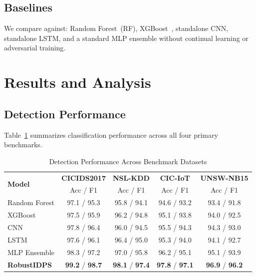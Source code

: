 \documentclass[journal,twoside]{IEEEtran}
\begin{document}
\subsection{Baselines}
We compare against: Random Forest~(RF), XGBoost~\cite{Chen2016}, standalone CNN, standalone LSTM, and a standard MLP ensemble without continual learning or adversarial training.

\section{Results and Analysis}
\label{sec:results}

\subsection{Detection Performance}

Table~\ref{tab:detection} summarizes classification performance across all four primary benchmarks.

\begin{table}[!t]
\centering
\caption{Detection Performance Across Benchmark Datasets}
\label{tab:detection}
\renewcommand{\arraystretch}{1.15}
\begin{tabular}{@{}lcccc@{}}
\toprule
\multirow{2}{*}{\textbf{Model}} & \textbf{CICIDS2017} & \textbf{NSL-KDD} & \textbf{CIC-IoT} & \textbf{UNSW-NB15} \\
 & Acc / F1 & Acc / F1 & Acc / F1 & Acc / F1 \\
\midrule
Random Forest   & 97.1 / 95.3 & 95.8 / 94.1 & 94.6 / 93.2 & 93.4 / 91.8 \\
XGBoost         & 97.5 / 95.9 & 96.2 / 94.8 & 95.1 / 93.8 & 94.0 / 92.5 \\
CNN             & 97.8 / 96.4 & 96.0 / 94.5 & 95.5 / 94.3 & 94.3 / 93.0 \\
LSTM            & 97.6 / 96.1 & 96.4 / 95.0 & 95.3 / 94.0 & 94.1 / 92.7 \\
MLP Ensemble    & 98.3 / 97.2 & 97.0 / 95.8 & 96.2 / 95.1 & 95.1 / 93.9 \\
\midrule
\textbf{RobustIDPS} & \textbf{99.2} / \textbf{98.7} & \textbf{98.1} / \textbf{97.4} & \textbf{97.8} / \textbf{97.1} & \textbf{96.9} / \textbf{96.2} \\
\bottomrule
\end{tabular}
\end{table}
\end{document}
